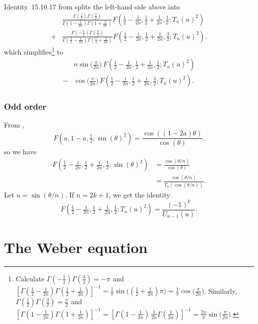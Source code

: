 \documentclass{article}
\begin{document}
Identity~15.10.17 from \cite{dlmf} splits the left-hand side above into
\begin{align*}
& \frac{\Gamma(\tfrac{1}{2}) \Gamma(\tfrac{3}{2})}{\Gamma(1 - \tfrac{1}{2n})\Gamma(1 + \tfrac{1}{2n})} F(\tfrac{1}{2} - \tfrac{1}{2n}, \tfrac{1}{2} + \tfrac{1}{2n}, \tfrac{1}{2}; T_n(u)^2) \\
+ & \frac{\Gamma(-\tfrac{1}{2}) \Gamma(\tfrac{3}{2})}{\Gamma(\tfrac{1}{2} - \tfrac{1}{2n})\Gamma(\tfrac{1}{2} + \tfrac{1}{2n})} F(\tfrac{1}{2} - \tfrac{1}{2n}, \tfrac{1}{2} + \tfrac{1}{2n}, \tfrac{3}{2}; T_n(u)^2).
\end{align*}
which simplifies\footnote{Calculate $\Gamma(-\tfrac{1}{2}) \Gamma(\tfrac{3}{2}) = -\pi$ and $[\Gamma(\tfrac{1}{2} - \tfrac{1}{2n})\Gamma(\tfrac{1}{2} + \tfrac{1}{2n})]^{-1} = \tfrac{1}{\pi} \sin\big((\tfrac{1}{2} + \tfrac{1}{2n})\pi\big) = \tfrac{1}{\pi} \cos\big(\tfrac{\pi}{2n}\big)$. Similarly, $\Gamma(\tfrac{1}{2}) \Gamma(\tfrac{3}{2}) = \tfrac{\pi}{2}$ and $[\Gamma(1 - \tfrac{1}{2n})\Gamma(1 + \tfrac{1}{2n})]^{-1} = [\Gamma(1 - \tfrac{1}{2n})\,\tfrac{1}{2n} \Gamma(\tfrac{1}{2n})]^{-1} = \tfrac{2n}{\pi} \sin\big(\tfrac{\pi}{2n}\big)$.} to
\begin{align*}
& n \sin\big(\tfrac{\pi}{2n}\big)\,F(\tfrac{1}{2} - \tfrac{1}{2n}, \tfrac{1}{2} + \tfrac{1}{2n}, \tfrac{1}{2}; T_n(u)^2) \\
- & \cos\big(\tfrac{\pi}{2n}\big)\,F(\tfrac{1}{2} - \tfrac{1}{2n}, \tfrac{1}{2} + \tfrac{1}{2n}, \tfrac{3}{2}; T_n(u)^2).
\end{align*}
\subsubsection{Odd order}
From \cite[equation~15.4.14]{dlmf},
\[ F(a, 1-a, \tfrac{1}{2}; \sin(\theta)^2) = \frac{\cos((1-2a)\theta)}{\cos(\theta)}. \]
so we have
\begin{align*}
F\left(\tfrac{1}{2} - \tfrac{1}{2n}, \tfrac{1}{2} + \tfrac{1}{2n}, \tfrac{1}{2}; \sin(\theta)^2\right) & = \frac{\cos(\theta/n)}{\cos(\theta)} \\
& = \frac{\cos(\theta/n)}{T_n(\cos(\theta/n))}.
\end{align*}
Let $u = \sin(\theta/n)$. If $n = 2k + 1$, we get the identity
\[ F\left(\tfrac{1}{2} - \tfrac{1}{2n}, \tfrac{1}{2} + \tfrac{1}{2n}, \tfrac{1}{2}; T_n(u)^2\right) = \frac{(-1)^k}{U_{n-1}(u)}. \]
\section{The Weber equation}
\end{document}

